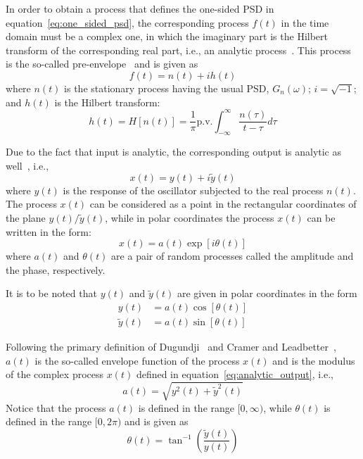 \documentclass[12pt]{article}
\begin{document}
In order to obtain a process that defines the one-sided PSD in equation~\eqref{eq:one_sided_psd}, the corresponding process $f(t)$ in the time domain must be a complex one, in which the imaginary part is the Hilbert transform of the corresponding real part, i.e., an analytic process~\cite{dipaola1985}. This process is the so-called pre-envelope~\cite{arens1957, dugundji1958} and is given as
\begin{equation}
    f(t) = n(t) + i h(t)
    \label{eq:pre_envelope}
\end{equation}
where $n(t)$ is the stationary process having the usual PSD, $G_n(\omega)$; $i = \sqrt{-1}$; and $h(t)$ is the Hilbert transform:
\begin{equation}
    h(t) = H[n(t)] = \frac{1}{\pi} \text{p.v.} \int_{-\infty}^{\infty} \frac{n(\tau)}{t - \tau} d\tau
    \label{eq:hilbert_transform}
\end{equation}

Due to the fact that input is analytic, the corresponding output is analytic as well~\cite{krenk1981}, i.e.,
\begin{equation}
    x(t) = y(t) + i \tilde{y}(t)
    \label{eq:analytic_output}
\end{equation}
where $y(t)$ is the response of the oscillator subjected to the real process $n(t)$. The process $x(t)$ can be considered as a point in the rectangular coordinates of the plane $y(t)/\tilde{y}(t)$, while in polar coordinates the process $x(t)$ can be written in the form:
\begin{equation}
    x(t) = a(t) \exp\left[i\theta(t)\right]
    \label{eq:polar_output}
\end{equation}
where $a(t)$ and $\theta(t)$ are a pair of random processes called the amplitude and the phase, respectively.

It is to be noted that $y(t)$ and $\tilde{y}(t)$ are given in polar coordinates in the form
\begin{align}
    y(t) &= a(t) \cos[\theta(t)] \label{eq:polar_y} \\
    \tilde{y}(t) &= a(t) \sin[\theta(t)] \label{eq:polar_ytilde}
\end{align}

Following the primary definition of Dugundji~\cite{dugundji1958} and Cramer and Leadbetter~\cite{cramer1967}, $a(t)$ is the so-called envelope function of the process $x(t)$ and is the modulus of the complex process $x(t)$ defined in equation~\eqref{eq:analytic_output}, i.e.,
\begin{equation}
    a(t) = \sqrt{y^2(t) + \tilde{y}^2(t)}
    \label{eq:envelope_def}
\end{equation}
Notice that the process $a(t)$ is defined in the range $[0, \infty)$, while $\theta(t)$ is defined in the range $[0, 2\pi)$ and is given as
\begin{equation}
    \theta(t) = \tan^{-1} \left( \frac{\tilde{y}(t)}{y(t)} \right)
    \label{eq:phase_def}
\end{equation}
\end{document}
